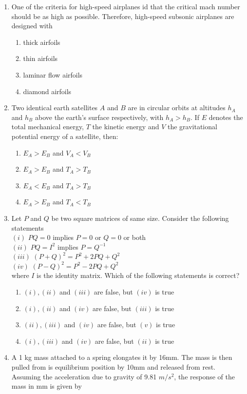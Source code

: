 \documentclass[journal]{IEEEtran}
\begin{document}
\begin{enumerate}
\item One of the criteria for high-speed airplanes id that the critical mach number should be as high as possible. Therefore, high-speed subsonic airplanes are designed with
\begin{enumerate}
    \item thick airfoils
    \item thin airfoils
    \item laminar flow airfoils
    \item diamond airfoils
\end{enumerate}
\item Two identical earth satellites $A$ and $B$ are in circular orbits at altitudes $h_{A}$ and $h_{B}$ above the earth's surface respectively, with $h_{A}>h_{B}$. If $E$ denotes the total mechanical energy, $T$ the kinetic energy and $V$ the gravitational potential energy of a satellite, then:
\begin{enumerate}
    \item $E_{A}>E_{B}$ and $V_{A}<V_{B}$
    \item $E_{A}>E_{B}$ and $T_{A}>T_{B}$
    \item $E_{A}<E_{B}$ and $T_{A}>T_{B}$
    \item $E_{A}>E_{B}$ and $T_{A}<T_{B}$
\end{enumerate}
\item Let $P$ and $Q$ be two square matrices of same size. Consider the following statements \\
     $(i)$ $PQ=0$ implies $P=0$ or $Q=0$ or both \\
     $(ii)$ $PQ=I^{2}$ implies $P=Q^{-1}$ \\
     $(iii)$ $(P+Q)^{2}=P^{2}+2PQ+Q^{2}$ \\
     $(iv)$ $(P-Q)^{2}=P^{2}-2PQ+Q^{2}$ \\ 
     where $I$ is the identity matrix. Which of the following statements is correct?
     \begin{enumerate}
         \item $(i),(ii)$ and $(iii)$ are false, but $(iv)$ is true
         \item $(i),(ii)$ and $(iv)$ are false, but $(iii)$ is true
         \item $(ii),(iii)$ and $(iv)$ are false, but $(v)$ is true
        \item $(i),(iii)$ and $(iv)$ are false, but $(ii)$ is true
     \end{enumerate}
     \item A 1 kg mass attached to a spring elongates it by 16mm. The mass is then pulled from is equilibrium position by 10mm and released from rest. Assuming the acceleration due to gravity of 9.81 $m/s^{2}$, the response of the mass in mm is given by

\end{enumerate}
\end{document}
